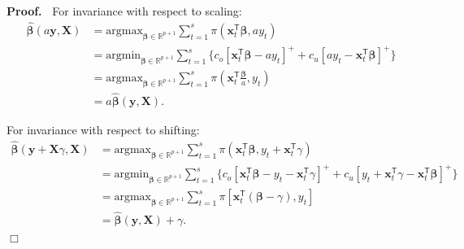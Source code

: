 \documentclass[a4paper,11pt]{article}
\newenvironment{proof}
 {\begin{trivlist} \item[] {\bf Proof.\ }}{\hfill$\Box$ \end{trivlist}}
\begin{document}
\begin{proof}
For invariance with respect to scaling:
\[
    \begin{aligned}
        \hat{\boldsymbol{\beta}}(a\mathbf{y},\mathbf{X})
        &=\text{argmax}_{\boldsymbol{\beta}\in \mathbb{R}^{p+1}}\displaystyle\sum_{t=1}^s{\pi(\mathbf{x}_t^{\mathsf{T}}\boldsymbol{\beta},ay_t)}\\
        &=\text{argmin}_{\boldsymbol{\beta}\in \mathbb{R}^{p+1}}\displaystyle\sum_{t=1}^s{\{c_o[\mathbf{x}_t^{\mathsf{T}}\boldsymbol{\beta}-ay_t]^{+}+c_u[ay_t-\mathbf{x}_t^{\mathsf{T}}\boldsymbol{\beta}]^{+}\}}\\
        &=\text{argmax}_{\boldsymbol{\beta}\in \mathbb{R}^{p+1}}\displaystyle\sum_{t=1}^s{\pi\left(\mathbf{x}_t^{\mathsf{T}}\frac{\boldsymbol{\beta}}{a},y_t\right)}\\
        &=a\hat{\boldsymbol{\beta}}(\mathbf{y},\mathbf{X}).
    \end{aligned}
\]

\noindent
For invariance with respect to shifting:
\[
    \begin{aligned}
        \hat{\boldsymbol{\beta}}(\mathbf{y}+\mathbf{X}\gamma,\mathbf{X})
        &=\text{argmax}_{\boldsymbol{\beta}\in \mathbb{R}^{p+1}}\displaystyle\sum_{t=1}^s{\pi(\mathbf{x}_t^{\mathsf{T}}\boldsymbol{\beta},y_t+\mathbf{x}_t^{\mathsf{T}}\gamma)}\\
        &=\text{argmin}_{\boldsymbol{\beta}\in \mathbb{R}^{p+1}}\displaystyle\sum_{t=1}^s{\{c_o[\mathbf{x}_t^{\mathsf{T}}\boldsymbol{\beta}-y_t-\mathbf{x}_t^{\mathsf{T}}\gamma]^{+}+c_u[y_t+\mathbf{x}_t^{\mathsf{T}}\gamma-\mathbf{x}_t^{\mathsf{T}}\boldsymbol{\beta}]^{+}\}}\\
        &=\text{argmax}_{\boldsymbol{\beta}\in \mathbb{R}^{p+1}}\displaystyle\sum_{t=1}^s{\pi[\mathbf{x}_t^{\mathsf{T}}(\boldsymbol{\beta}-\gamma),y_t]}\\
        &=\hat{\boldsymbol{\beta}}(\mathbf{y},\mathbf{X})+\gamma.
    \end{aligned}
\]
\end{proof}
\end{document}
